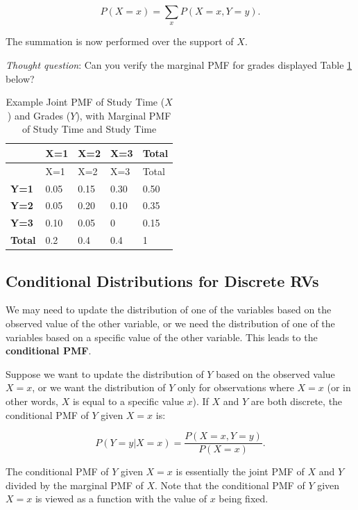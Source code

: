 \documentclass[
]{book}
\begin{document}
\begin{equation} 
P(X=x) = \sum_x P(X=x, Y=y).
\label{eq:5-margPMF2}
\end{equation}

The summation is now performed over the support of \(X\).

\emph{Thought question}: Can you verify the marginal PMF for grades displayed Table \ref{tab:5-marg-table2} below?

\begin{longtable}[]{@{}lllll@{}}
\caption{\label{tab:5-marg-table2} Example Joint PMF of Study Time (\(X\)) and Grades (\(Y\)), with Marginal PMF of Study Time and Study Time}\tabularnewline
\toprule\noalign{}
& X=1 & X=2 & X=3 & Total \\
\midrule\noalign{}
\endfirsthead
\toprule\noalign{}
& X=1 & X=2 & X=3 & Total \\
\midrule\noalign{}
\endhead
\bottomrule\noalign{}
\endlastfoot
\textbf{Y=1} & 0.05 & 0.15 & 0.30 & 0.50 \\
\textbf{Y=2} & 0.05 & 0.20 & 0.10 & 0.35 \\
\textbf{Y=3} & 0.10 & 0.05 & 0 & 0.15 \\
\textbf{Total} & 0.2 & 0.4 & 0.4 & 1 \\
\end{longtable}

\hypertarget{conddist}{%
\subsection{Conditional Distributions for Discrete RVs}\label{conddist}}

We may need to update the distribution of one of the variables based on the observed value of the other variable, or we need the distribution of one of the variables based on a specific value of the other variable. This leads to the \textbf{conditional PMF}.

Suppose we want to update the distribution of \(Y\) based on the observed value \(X=x\), or we want the distribution of \(Y\) only for observations where \(X=x\) (or in other words, \(X\) is equal to a specific value \(x\)). If \(X\) and \(Y\) are both discrete, the conditional PMF of \(Y\) given \(X=x\) is:

\begin{equation} 
P(Y=y|X=x) = \frac{P(X=x, Y=y)}{P(X=x)}.
\label{eq:5-condPMFY}
\end{equation}

The conditional PMF of \(Y\) given \(X=x\) is essentially the joint PMF of \(X\) and \(Y\) divided by the marginal PMF of \(X\). Note that the conditional PMF of \(Y\) given \(X=x\) is viewed as a function with the value of \(x\) being fixed.
\end{document}
